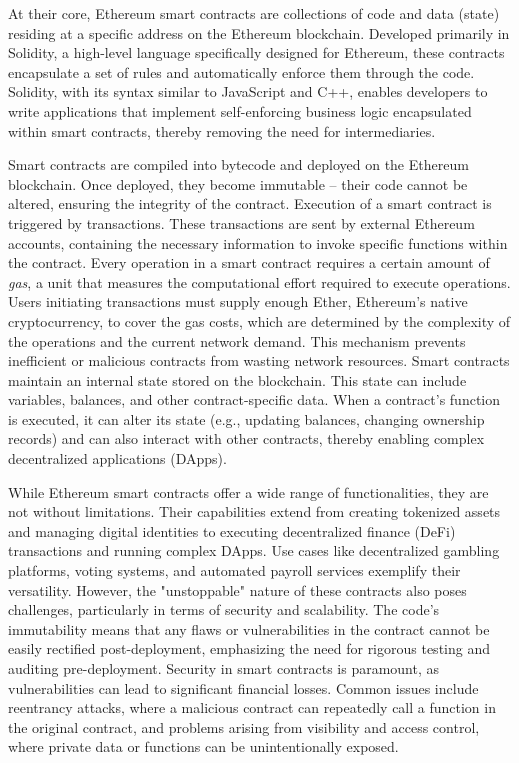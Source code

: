 At their core, Ethereum smart contracts are collections of code and data (state) residing at a specific address on the Ethereum blockchain. Developed primarily in Solidity, a high-level language specifically designed for Ethereum, these contracts encapsulate a set of rules and automatically enforce them through the code. Solidity, with its syntax similar to JavaScript and C++, enables developers to write applications that implement self-enforcing business logic encapsulated within smart contracts, thereby removing the need for intermediaries.

Smart contracts are compiled into bytecode and deployed on the Ethereum blockchain. Once deployed, they become immutable – their code cannot be altered, ensuring the integrity of the contract. Execution of a smart contract is triggered by transactions. These transactions are sent by external Ethereum accounts, containing the necessary information to invoke specific functions within the contract. Every operation in a smart contract requires a certain amount of \textit{gas}, a unit that measures the computational effort required to execute operations. Users initiating transactions must supply enough Ether, Ethereum's native cryptocurrency, to cover the gas costs, which are determined by the complexity of the operations and the current network demand. This mechanism prevents inefficient or malicious contracts from wasting network resources. Smart contracts maintain an internal state stored on the blockchain. This state can include variables, balances, and other contract-specific data. When a contract's function is executed, it can alter its state (e.g., updating balances, changing ownership records) and can also interact with other contracts, thereby enabling complex decentralized applications (DApps).

While Ethereum smart contracts offer a wide range of functionalities, they are not without limitations. Their capabilities extend from creating tokenized assets and managing digital identities to executing decentralized finance (DeFi) transactions and running complex DApps. Use cases like decentralized gambling platforms, voting systems, and automated payroll services exemplify their versatility. However, the "unstoppable" nature of these contracts also poses challenges, particularly in terms of security and scalability. The code's immutability means that any flaws or vulnerabilities in the contract cannot be easily rectified post-deployment, emphasizing the need for rigorous testing and auditing pre-deployment. Security in smart contracts is paramount, as vulnerabilities can lead to significant financial losses. Common issues include reentrancy attacks, where a malicious contract can repeatedly call a function in the original contract, and problems arising from visibility and access control, where private data or functions can be unintentionally exposed. 

